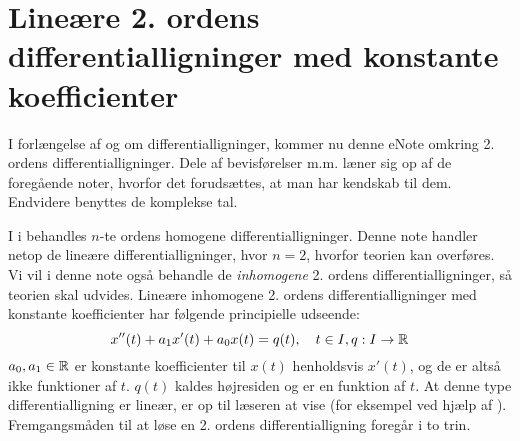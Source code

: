 
\setcounter{chapter}{12} %


\chapter[Lineære 2. ordens differentialligninger]{Lineære 2. ordens differentialligninger med konstante koefficienter} \label{tn13}

\begin{basis}
I forlængelse af  og  om differentialligninger, kommer nu denne eNote omkring 2. ordens differentialligninger. Dele af bevisførelser m.m. læner sig op af de foregående noter, hvorfor det forudsættes, at man har kendskab til dem. Endvidere benyttes de komplekse tal.
\end{basis}

I  i  behandles $ n $-te ordens homogene differentialligninger. Denne note handler netop de lineære differentialligninger, hvor $ n = 2 $, hvorfor teorien kan overføres. Vi vil i denne note også behandle de \textit{inhomogene} 2. ordens differentialligninger, så teorien skal udvides. Lineære inhomogene 2. ordens differentialligninger med konstante koefficienter har følgende principielle udseende:
\begin{equation}
x''(t) + a_1x'(t) + a_0x(t) = q(t), \quad t \in I, q : I \rightarrow \mathbb{R}
\end{equation}
$ a_0, a_1 \in \mathbb{R} $ er konstante koefficienter til $ x(t) $ henholdsvis $ x'(t) $, og de er altså ikke funktioner af $ t $. $ q(t) $ kaldes højresiden og er en funktion af $ t $. At denne type differentialligning er lineær, er op til læseren at vise (for eksempel ved hjælp af ). Fremgangsmåden til at løse en 2. ordens differentialligning foregår i to trin.

